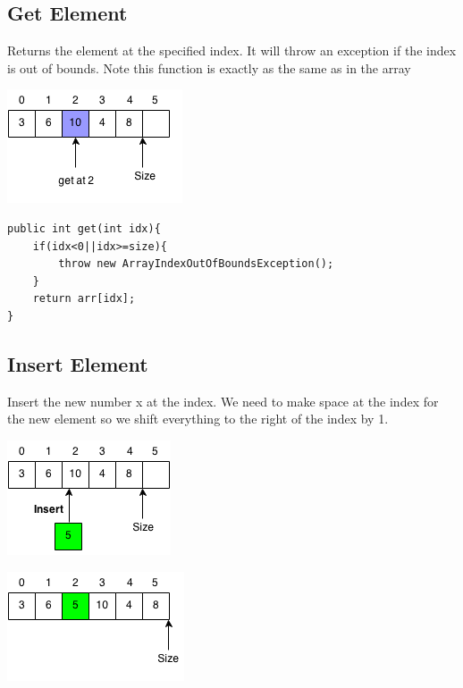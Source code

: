 \documentclass[11pt,oneside]{book}
\makeatletter
\def\maxwidth#1{\ifdim\Gin@nat@width>#1 #1\else\Gin@nat@width\fi}
\makeatother
\begin{document}
\subsection{Get Element}

Returns the element at the specified index. It will throw an exception if the index is out of bounds. Note this function is exactly as the same as in the array

\vspace{5px}\includegraphics[width=\maxwidth{\textwidth}]{vectorget.png}

\begin{lstlisting}
public int get(int idx){
    if(idx<0||idx>=size){
        throw new ArrayIndexOutOfBoundsException();
    }   
    return arr[idx];
}
\end{lstlisting}

\subsection{Insert Element}

Insert the new number x at the index. We need to make space at the index for the new element so we shift everything to the right of the index by 1.

\vspace{5px}\includegraphics[width=\maxwidth{\textwidth}]{vectorinsert.png}

\vspace{5px}\includegraphics[width=\maxwidth{\textwidth}]{vectorinsert2.png}
\end{document}
